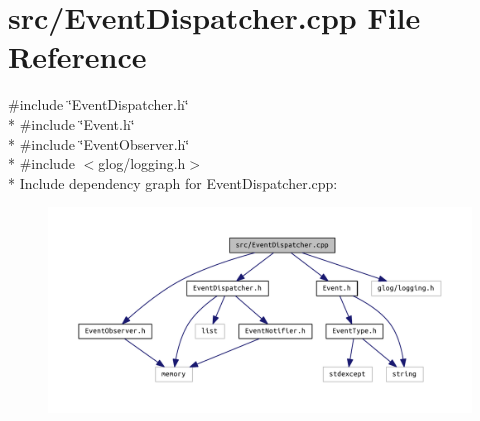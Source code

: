 \section{src/\+Event\+Dispatcher.cpp File Reference}
\label{_event_dispatcher_8cpp}
{\ttfamily \#include \char`\"{}Event\+Dispatcher.\+h\char`\"{}}\\*
{\ttfamily \#include \char`\"{}Event.\+h\char`\"{}}\\*
{\ttfamily \#include \char`\"{}Event\+Observer.\+h\char`\"{}}\\*
{\ttfamily \#include $<$glog/logging.\+h$>$}\\*
Include dependency graph for Event\+Dispatcher.\+cpp\+:
\nopagebreak
\begin{figure}[H]
\begin{center}
\leavevmode
\includegraphics[width=350pt]{_event_dispatcher_8cpp__incl}
\end{center}
\end{figure}
